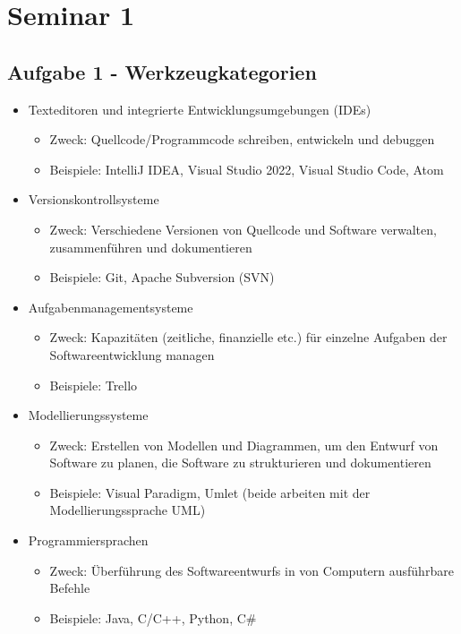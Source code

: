 

\section{Seminar 1}


\subsection{Aufgabe 1 - Werkzeugkategorien}

\begin{itemize}
	\item Texteditoren und integrierte Entwicklungsumgebungen (IDEs)
	\begin{itemize}
		\item Zweck: Quellcode/Programmcode schreiben, entwickeln und debuggen
		\item Beispiele: IntelliJ IDEA, Visual Studio 2022, Visual Studio Code, Atom
	\end{itemize}
	\item Versionskontrollsysteme
	\begin{itemize}
		\item Zweck: Verschiedene Versionen von Quellcode und Software verwalten, zusammenführen und dokumentieren
		\item Beispiele: Git, Apache Subversion (SVN)
	\end{itemize}
	\item Aufgabenmanagementsysteme
	\begin{itemize}
		\item Zweck: Kapazitäten (zeitliche, finanzielle etc.) für einzelne Aufgaben der Softwareentwicklung managen
		\item Beispiele: Trello
	\end{itemize}
	\item Modellierungssysteme
	\begin{itemize}
		\item Zweck: Erstellen von Modellen und Diagrammen, um den Entwurf von Software zu planen, die Software zu strukturieren und dokumentieren
		\item Beispiele: Visual Paradigm, Umlet (beide arbeiten mit der Modellierungssprache UML)
	\end{itemize}
	\item Programmiersprachen 
	\begin{itemize}
		\item Zweck: Überführung des Softwareentwurfs in von Computern ausführbare Befehle
		\item Beispiele: Java, C/C++, Python, C\#
	\end{itemize}
\end{itemize}


